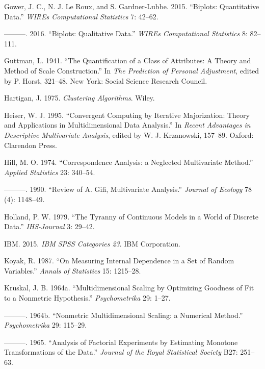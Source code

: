 \documentclass[
  12pt,
  letterpaper,
]{scrbook}
\newlength{\cslhangindent}
\newenvironment{CSLReferences}[2] %
 {\begin{list}{}{%
  \setlength{\itemindent}{0pt}
  \setlength{\leftmargin}{0pt}
  \setlength{\parsep}{0pt}
  \ifodd #1
   \setlength{\leftmargin}{\cslhangindent}
   \setlength{\itemindent}{-1\cslhangindent}
  \fi
  \setlength{\itemsep}{#2\baselineskip}}}
 {\end{list}}
\begin{document}
\begin{CSLReferences}{1}{0}
Gower, J. C., N. J. Le Roux, and S. Gardner-Lubbe. 2015. {``{Biplots:
Quantitative Data}.''} \emph{WIREs Computational Statistics} 7: 42--62.

---------. 2016. {``{Biplots: Qualitative Data}.''} \emph{WIREs
Computational Statistics} 8: 82--111.

Guttman, L. 1941. {``{The Quantification of a Class of Attributes: A
Theory and Method of Scale Construction}.''} In \emph{The Prediction of
Personal Adjustment}, edited by P. Horst, 321--48. New York: Social
Science Research Council.

Hartigan, J. 1975. \emph{Clustering Algorithms}. Wiley.

Heiser, W. J. 1995. {``{Convergent Computing by Iterative Majorization:
Theory and Applications in Multidimensional Data Analysis}.''} In
\emph{Recent Advantages in Descriptive Multivariate Analysis}, edited by
W. J. Krzanowski, 157--89. Oxford: Clarendon Press.

Hill, M. O. 1974. {``{Correspondence Analysis: a Neglected Multivariate
Method}.''} \emph{Applied Statistics} 23: 340--54.

---------. 1990. {``{Review of A. Gifi, Multivariate Analysis}.''}
\emph{Journal of Ecology} 78 (4): 1148--49.

Holland, P. W. 1979. {``{The Tyranny of Continuous Models in a World of
Discrete Data}.''} \emph{IHS-Journal} 3: 29--42.

IBM. 2015. \emph{IBM SPSS Categories 23}. IBM Corporation.

Koyak, R. 1987. {``{On Measuring Internal Dependence in a Set of Random
Variables}.''} \emph{Annals of Statistics} 15: 1215--28.

Kruskal, J. B. 1964a. {``{Multidimensional Scaling by Optimizing
Goodness of Fit to a Nonmetric Hypothesis}.''} \emph{Psychometrika} 29:
1--27.

---------. 1964b. {``{Nonmetric Multidimensional Scaling: a Numerical
Method}.''} \emph{Psychometrika} 29: 115--29.

---------. 1965. {``{Analysis of Factorial Experiments by Estimating
Monotone Transformations of the Data}.''} \emph{Journal of the Royal
Statistical Society} B27: 251--63.


\end{CSLReferences}
\end{document}
